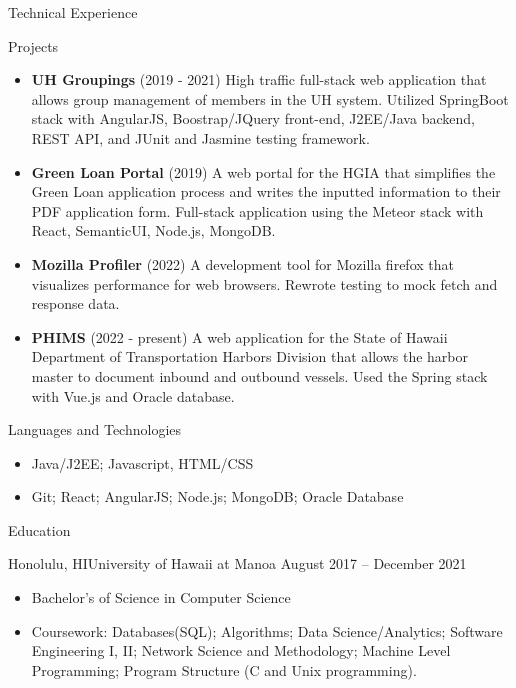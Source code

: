 \documentclass[]{mcdowellcv}
\begin{document}
	\begin{cvsection}{Technical Experience}
		\begin{cvsubsection}{Projects}{}{}
			\begin{itemize}
				\item \textbf{UH Groupings} (2019 - 2021) High traffic full-stack web application that allows group management of members in the UH system. Utilized SpringBoot stack with AngularJS, Boostrap/JQuery front-end, J2EE/Java backend, REST API, and JUnit and Jasmine testing framework.
				\item \textbf{Green Loan Portal} (2019) A web portal for the HGIA that simplifies the Green Loan application process and writes the inputted information to their PDF application form. Full-stack application using the Meteor stack with React, SemanticUI, Node.js, MongoDB.
				\item \textbf{Mozilla Profiler} (2022) A development tool for Mozilla firefox that visualizes performance for web browsers. Rewrote testing to mock fetch and response data.
				\item \textbf{PHIMS} (2022 - present) A web application for the State of Hawaii Department of Transportation Harbors Division that allows the harbor master to document inbound and outbound vessels. Used the Spring stack with Vue.js and Oracle database.
			\end{itemize}
		\end{cvsubsection}
	\end{cvsection}
	
	\begin{cvsection}{Languages and Technologies}
		\begin{cvsubsection}{}{}{}	
			\begin{itemize}
				\item Java/J2EE; Javascript, HTML/CSS
				\item Git; React; AngularJS; Node.js; MongoDB; Oracle Database
			\end{itemize}
		\end{cvsubsection}
	\end{cvsection}

	\begin{cvsection}{Education}
		\begin{cvsubsection}{Honolulu, HI}{University of Hawaii at Manoa }{August 2017 -- December 2021}
			\begin{itemize}
				\item Bachelor's of Science in Computer Science
				\item Coursework: Databases(SQL); Algorithms; Data Science/Analytics; Software Engineering I, II; Network Science and Methodology; Machine Level Programming; Program Structure (C and Unix programming).
			\end{itemize}
		\end{cvsubsection}
	\end{cvsection}
\end{document}
